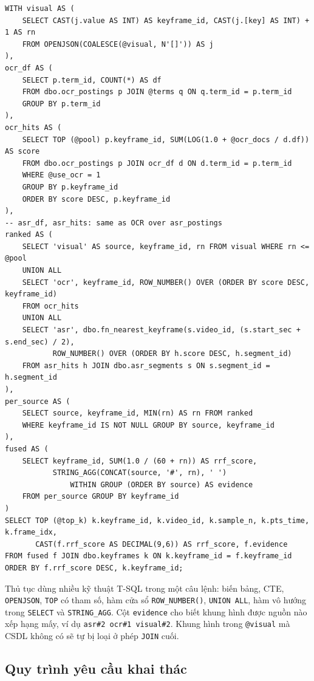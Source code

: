 \begin{lstlisting}[caption={Phần gộp kết quả của sp\_search\_footage (rút gọn)}, label={lst:search}]
WITH visual AS (
    SELECT CAST(j.value AS INT) AS keyframe_id, CAST(j.[key] AS INT) + 1 AS rn
    FROM OPENJSON(COALESCE(@visual, N'[]')) AS j
),
ocr_df AS (
    SELECT p.term_id, COUNT(*) AS df
    FROM dbo.ocr_postings p JOIN @terms q ON q.term_id = p.term_id
    GROUP BY p.term_id
),
ocr_hits AS (
    SELECT TOP (@pool) p.keyframe_id, SUM(LOG(1.0 + @ocr_docs / d.df)) AS score
    FROM dbo.ocr_postings p JOIN ocr_df d ON d.term_id = p.term_id
    WHERE @use_ocr = 1
    GROUP BY p.keyframe_id
    ORDER BY score DESC, p.keyframe_id
),
-- asr_df, asr_hits: same as OCR over asr_postings
ranked AS (
    SELECT 'visual' AS source, keyframe_id, rn FROM visual WHERE rn <= @pool
    UNION ALL
    SELECT 'ocr', keyframe_id, ROW_NUMBER() OVER (ORDER BY score DESC, keyframe_id)
    FROM ocr_hits
    UNION ALL
    SELECT 'asr', dbo.fn_nearest_keyframe(s.video_id, (s.start_sec + s.end_sec) / 2),
           ROW_NUMBER() OVER (ORDER BY h.score DESC, h.segment_id)
    FROM asr_hits h JOIN dbo.asr_segments s ON s.segment_id = h.segment_id
),
per_source AS (
    SELECT source, keyframe_id, MIN(rn) AS rn FROM ranked
    WHERE keyframe_id IS NOT NULL GROUP BY source, keyframe_id
),
fused AS (
    SELECT keyframe_id, SUM(1.0 / (60 + rn)) AS rrf_score,
           STRING_AGG(CONCAT(source, '#', rn), ' ')
               WITHIN GROUP (ORDER BY source) AS evidence
    FROM per_source GROUP BY keyframe_id
)
SELECT TOP (@top_k) k.keyframe_id, k.video_id, k.sample_n, k.pts_time, k.frame_idx,
       CAST(f.rrf_score AS DECIMAL(9,6)) AS rrf_score, f.evidence
FROM fused f JOIN dbo.keyframes k ON k.keyframe_id = f.keyframe_id
ORDER BY f.rrf_score DESC, k.keyframe_id;
\end{lstlisting}

Thủ tục dùng nhiều kỹ thuật T-SQL trong một câu lệnh: biến bảng, CTE, \texttt{OPENJSON},
\texttt{TOP} có tham số, hàm cửa sổ \texttt{ROW\_NUMBER()}, \texttt{UNION ALL}, hàm vô
hướng trong \texttt{SELECT} và \texttt{STRING\_AGG}. Cột \texttt{evidence} cho biết khung
hình được nguồn nào xếp hạng mấy, ví dụ \texttt{asr\#2 ocr\#1 visual\#2}. Khung hình trong
\texttt{@visual} mà CSDL không có sẽ tự bị loại ở phép \texttt{JOIN} cuối.

\subsection{Quy trình yêu cầu khai thác}

